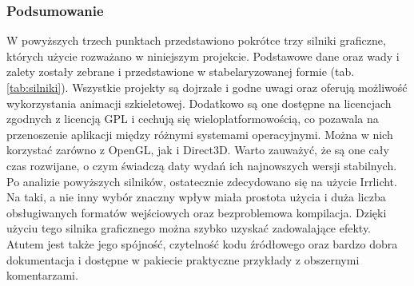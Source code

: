 \documentclass[11pt]{mwrep}
\begin{document}
      \subsubsection{Podsumowanie}

      W powyższych trzech punktach przedstawiono pokrótce trzy silniki graficzne, których użycie rozważano w niniejszym projekcie. Podstawowe dane oraz wady i zalety zostały zebrane i przedstawione w stabelaryzowanej formie (tab. \ref{tab:silniki}). Wszystkie projekty są dojrzałe i godne uwagi oraz oferują możliwość wykorzystania animacji szkieletowej. Dodatkowo są one dostępne na licencjach zgodnych z licencją GPL i cechują się wieloplatformowością, co pozawala na przenoszenie aplikacji między różnymi systemami operacyjnymi. Można w nich korzystać zarówno z OpenGL, jak i Direct3D. Warto zauważyć, że są one cały czas rozwijane, o czym świadczą daty wydań ich najnowszych wersji stabilnych. Po analizie powyższych silników, ostatecznie zdecydowano się na użycie Irrlicht. Na taki, a nie inny wybór znaczny wpływ miała prostota użycia i duża liczba obsługiwanych formatów wejściowych oraz bezproblemowa kompilacja. Dzięki użyciu tego silnika graficznego można szybko uzyskać zadowalające efekty. Atutem jest także jego spójność, czytelność kodu źródłowego oraz bardzo dobra dokumentacja i dostępne w pakiecie praktyczne przykłady z obszernymi komentarzami.
\end{document}
